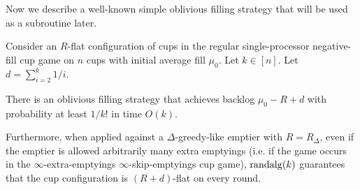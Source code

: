 Now we describe a well-known simple oblivious filling strategy
that will be used as a subroutine later.
\begin{proposition}
  \label{prop:TO_randalg} %
  Consider an $R$-flat configuration of cups in the
  regular single-processor negative-fill cup game on $n$ cups with
  initial average fill $\mu_0$. Let $k \in [n]$. Let $d =
  \sum_{i=2}^k 1/i.$

  There is an oblivious filling strategy 
  that achieves backlog $\mu_0 - R + d$ with
  probability at least $1/k!$ in time $O(k)$.

  Furthermore, when applied against a $\Delta$-greedy-like
  emptier with $R = R_\Delta$, even if the emptier is allowed
  arbitrarily many extra emptyings (i.e. if the game occurs in
  the $\infty$-extra-emptyings $\infty$-skip-emptyings cup game),
  $\operatorname{\text{\textup{randalg}}}(k)$ guarantees that the cup configuration is $(R +
  d)$-flat on every round.
\end{proposition}
